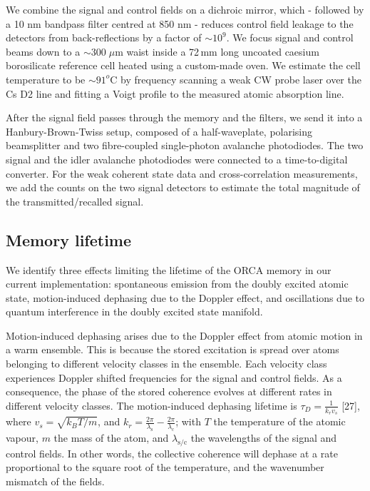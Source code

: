 \documentclass[%
 reprint,
 amsmath,amssymb,
 aps,
 pra,
]{revtex4-1}
\begin{document}
We combine the signal and control fields on a dichroic mirror, which - followed by a 10 nm bandpass filter centred at 850 nm - reduces control field leakage to the detectors from back-reflections by a factor of $\sim10^9$. We focus signal and control beams down to a $\sim300\;\mu$m waist inside a 72$\,$mm long uncoated caesium borosilicate reference cell heated using a custom-made oven. We estimate the cell temperature to be $\sim 91^o$C by frequency scanning a weak CW probe laser over the Cs D2 line and fitting a Voigt profile to the measured atomic absorption line.

After the signal field passes through the memory and the filters, we send it into a Hanbury-Brown-Twiss setup, composed of a half-waveplate, polarising beamsplitter and two fibre-coupled single-photon avalanche photodiodes. The two signal and the idler avalanche photodiodes were connected to a time-to-digital converter. For the weak coherent state data and cross-correlation measurements, we add the counts on the two signal detectors to estimate the total magnitude of the transmitted/recalled signal.

\subsection{Memory lifetime \label{lifetime}}
We identify three effects limiting the lifetime of the ORCA memory in our current implementation: spontaneous emission from the doubly excited atomic state, motion-induced dephasing due to the Doppler effect, and oscillations due to quantum interference in the doubly excited state manifold.

Motion-induced dephasing arises due to the Doppler effect from atomic motion in a warm ensemble. This is because the stored excitation is spread over atoms belonging to different velocity classes in the ensemble. Each velocity class experiences Doppler shifted frequencies for the signal and control fields. As a consequence, the phase of the stored coherence evolves at different rates in different velocity classes. The motion-induced dephasing lifetime is $\tau_D = \frac{1}{k_r v_s}$ [27], where $v_s = \sqrt{k_B T/m}$, and $k_r=\frac{2\pi}{\lambda_\mathrm{s}} -\frac{2\pi}{\lambda_\mathrm{c}}$; with $T$ the temperature of the atomic vapour, $m$ the mass of the atom, and $\lambda_\mathrm{s/c}$ the wavelengths of the signal and control fields. In other words, the collective coherence will dephase at a rate proportional to the square root of the temperature, and the wavenumber mismatch of the fields.
\end{document}
